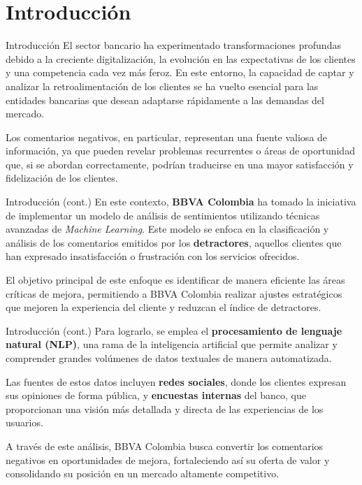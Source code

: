 \documentclass[aspectratio=169, xcolor={dvipsnames}, 10pt, spanish]{beamer}
\begin{document}
\section{Introducción}
\begin{frame}{Introducción}
    El sector bancario ha experimentado transformaciones profundas debido a la creciente digitalización, la evolución en las expectativas de los clientes y una competencia cada vez más feroz. En este entorno, la capacidad de captar y analizar la retroalimentación de los clientes se ha vuelto esencial para las entidades bancarias que desean adaptarse rápidamente a las demandas del mercado.

    \vfill
    Los comentarios negativos, en particular, representan una fuente valiosa de información, ya que pueden revelar problemas recurrentes o áreas de oportunidad que, si se abordan correctamente, podrían traducirse en una mayor satisfacción y fidelización de los clientes.
\end{frame}

\begin{frame}{Introducción (cont.)}
    En este contexto, \textbf{BBVA Colombia} ha tomado la iniciativa de implementar un modelo de análisis de sentimientos utilizando técnicas avanzadas de \textit{Machine Learning}. Este modelo se enfoca en la clasificación y análisis de los comentarios emitidos por los \textbf{detractores}, aquellos clientes que han expresado insatisfacción o frustración con los servicios ofrecidos.

    \vfill
    El objetivo principal de este enfoque es identificar de manera eficiente las áreas críticas de mejora, permitiendo a BBVA Colombia realizar ajustes estratégicos que mejoren la experiencia del cliente y reduzcan el índice de detractores.
\end{frame}

\begin{frame}{Introducción (cont.)}
    Para lograrlo, se emplea el \textbf{procesamiento de lenguaje natural (NLP)}, una rama de la inteligencia artificial que permite analizar y comprender grandes volúmenes de datos textuales de manera automatizada.

    \vfill
    Las fuentes de estos datos incluyen \textbf{redes sociales}, donde los clientes expresan sus opiniones de forma pública, y \textbf{encuestas internas} del banco, que proporcionan una visión más detallada y directa de las experiencias de los usuarios.

    \vfill
    A través de este análisis, BBVA Colombia busca convertir los comentarios negativos en oportunidades de mejora, fortaleciendo así su oferta de valor y consolidando su posición en un mercado altamente competitivo.
\end{frame}
\end{document}
